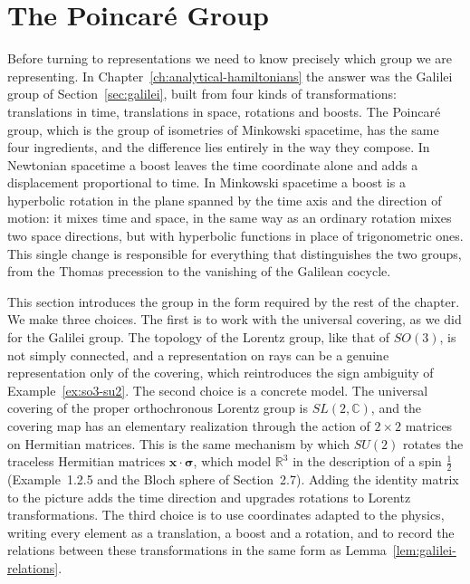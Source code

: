 	\section{The Poincar\'e Group}
	\label{sec:poincare-group}
	
	Before turning to representations we need to know precisely which group we are representing. In Chapter~\ref{ch:analytical-hamiltonians} the answer was the Galilei group of Section~\ref{sec:galilei}, built from four kinds of transformations: translations in time, translations in space, rotations and boosts. The Poincar\'e group, which is the group of isometries of Minkowski spacetime, has the same four ingredients, and the difference lies entirely in the way they compose. In Newtonian spacetime a boost leaves the time coordinate alone and adds a displacement proportional to time. In Minkowski spacetime a boost is a hyperbolic rotation in the plane spanned by the time axis and the direction of motion: it mixes time and space, in the same way as an ordinary rotation mixes two space directions, but with hyperbolic functions in place of trigonometric ones. This single change is responsible for everything that distinguishes the two groups, from the Thomas precession to the vanishing of the Galilean cocycle.
	
	This section introduces the group in the form required by the rest of the chapter. We make three choices. The first is to work with the universal covering, as we did for the Galilei group. The topology of the Lorentz group, like that of $SO(3)$, is not simply connected, and a representation on rays can be a genuine representation only of the covering, which reintroduces the sign ambiguity of Example~\ref{ex:so3-su2}. The second choice is a concrete model. The universal covering of the proper orthochronous Lorentz group is $SL(2,\mathbb{C})$, and the covering map has an elementary realization through the action of $2\times2$ matrices on Hermitian matrices. This is the same mechanism by which $SU(2)$ rotates the traceless Hermitian matrices $\mathbf{x}\cdot\boldsymbol{\sigma}$, which model $\mathbb{R}^3$ in the description of a spin $\frac12$ (Example~1.2.5 and the Bloch sphere of Section~2.7). Adding the identity matrix to the picture adds the time direction and upgrades rotations to Lorentz transformations. The third choice is to use coordinates adapted to the physics, writing every element as a translation, a boost and a rotation, and to record the relations between these transformations in the same form as Lemma~\ref{lem:galilei-relations}.
	
